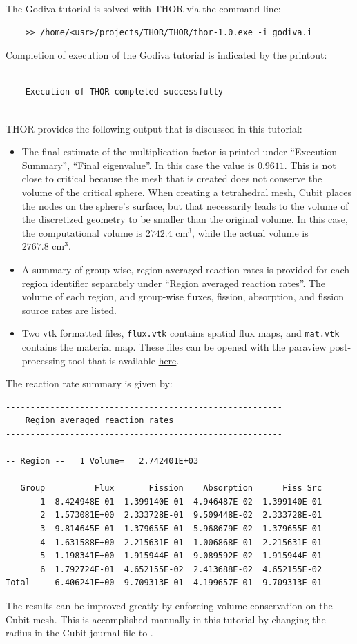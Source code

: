 The Godiva tutorial is solved with THOR via the command line:
\begin{verbatim}
    >> /home/<usr>/projects/THOR/THOR/thor-1.0.exe -i godiva.i
\end{verbatim}

Completion of execution of the Godiva tutorial is indicated by the printout:
\begin{verbatim}
--------------------------------------------------------
    Execution of THOR completed successfully  
 --------------------------------------------------------
\end{verbatim}

THOR provides the following output that is discussed in this tutorial:
\begin{itemize}
    \item The final estimate of the multiplication factor is printed under ``Execution Summary'', ``Final eigenvalue''. In this case the value is $0.9611$. This is not close to critical because the mesh that
    is created does not conserve the volume of the critical sphere. When creating a tetrahedral mesh,
    Cubit places the nodes on the sphere's surface, but that necessarily leads to the volume of the discretized geometry to be smaller than the original volume. In this case, the computational volume 
    is $2742.4\text{ cm}^3$, while the actual volume is $2767.8\text{ cm}^3$.
    \item A summary of group-wise, region-averaged reaction rates is provided for each region identifier separately under ``Region averaged reaction rates''. The volume of each region, and group-wise fluxes, fission, absorption, and fission source rates are listed. 
    \item Two vtk formatted files, \verb"flux.vtk" contains spatial flux maps, and \verb"mat.vtk" contains the material map. These files can be opened with the paraview post-processing tool that is available \href{https://www.paraview.org/download/}{here}.
\end{itemize}

The reaction rate summary is given by:
\begin{verbatim}
--------------------------------------------------------
    Region averaged reaction rates  
--------------------------------------------------------

-- Region --   1 Volume=   2.742401E+03

   Group          Flux       Fission    Absorption      Fiss Src
       1  8.424948E-01  1.399140E-01  4.946487E-02  1.399140E-01
       2  1.573081E+00  2.333728E-01  9.509448E-02  2.333728E-01
       3  9.814645E-01  1.379655E-01  5.968679E-02  1.379655E-01
       4  1.631588E+00  2.215631E-01  1.006868E-01  2.215631E-01
       5  1.198341E+00  1.915944E-01  9.089592E-02  1.915944E-01
       6  1.792724E-01  4.652155E-02  2.413688E-02  4.652155E-02
Total     6.406241E+00  9.709313E-01  4.199657E-01  9.709313E-01
\end{verbatim}

The results can be improved greatly by enforcing volume conservation on the Cubit mesh. This is accomplished manually in this tutorial by changing the radius in the Cubit journal file to .